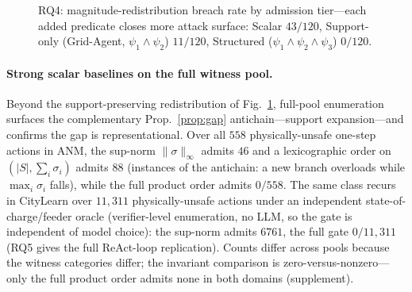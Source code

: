 \documentclass[letterpaper]{article} %
\theoremstyle{plain}
\begin{document}
\begin{figure}[t]
\centering
{}
\caption{RQ4: magnitude-redistribution breach rate by admission tier---each added predicate closes more attack surface: Scalar $43/120$, Support-only (Grid-Agent, $\psi_1\wedge\psi_2$) $11/120$, Structured ($\psi_1\wedge\psi_2\wedge\psi_3$) $0/120$.}
\label{fig:breach}
\end{figure}

\paragraph{Strong scalar baselines on the full witness pool.}
Beyond the support-preserving redistribution of Fig.~\ref{fig:breach}, full-pool enumeration surfaces the complementary Prop.~\ref{prop:gap} antichain---support expansion---and confirms the gap is representational. Over all $558$ physically-unsafe one-step actions in ANM, the sup-norm $\|\sigma\|_\infty$ admits $46$ and a lexicographic order on $(|S|,\sum_i\sigma_i)$ admits $88$ (instances of the antichain: a new branch overloads while $\max_i\sigma_i$ falls), while the full product order admits $0/558$. The same class recurs in CityLearn over $11{,}311$ physically-unsafe actions under an independent state-of-charge/feeder oracle (verifier-level enumeration, no LLM, so the gate is independent of model choice): the sup-norm admits $6761$, the full gate $0/11{,}311$ (RQ5 gives the full ReAct-loop replication). Counts differ across pools because the witness categories differ; the invariant comparison is zero-versus-nonzero---only the full product order admits none in both domains (supplement).
\end{document}
